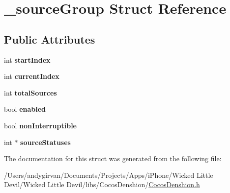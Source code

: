 \hypertarget{struct__source_group}{\section{\-\_\-source\-Group Struct Reference}
\label{struct__source_group}
}
\subsection*{Public Attributes}
\begin{DoxyCompactItemize}
\item 
\hypertarget{struct__source_group_aedf60c32c9f50907a1d7c4ceffebd34a}{int {\bfseries start\-Index}}\label{struct__source_group_aedf60c32c9f50907a1d7c4ceffebd34a}

\item 
\hypertarget{struct__source_group_ac8d629bee48fa95ffe085739c29c8393}{int {\bfseries current\-Index}}\label{struct__source_group_ac8d629bee48fa95ffe085739c29c8393}

\item 
\hypertarget{struct__source_group_af92866596e1c52d38901abb5986f1404}{int {\bfseries total\-Sources}}\label{struct__source_group_af92866596e1c52d38901abb5986f1404}

\item 
\hypertarget{struct__source_group_af41ac2109bf5383ea0c7e2816553055f}{bool {\bfseries enabled}}\label{struct__source_group_af41ac2109bf5383ea0c7e2816553055f}

\item 
\hypertarget{struct__source_group_a31063e653ba9ea9e93ba48131c704b4d}{bool {\bfseries non\-Interruptible}}\label{struct__source_group_a31063e653ba9ea9e93ba48131c704b4d}

\item 
\hypertarget{struct__source_group_a5d8722f751c1d2bfd47232307d6ba18c}{int $\ast$ {\bfseries source\-Statuses}}\label{struct__source_group_a5d8722f751c1d2bfd47232307d6ba18c}

\end{DoxyCompactItemize}


The documentation for this struct was generated from the following file\-:\begin{DoxyCompactItemize}
\item 
/\-Users/andygirvan/\-Documents/\-Projects/\-Apps/i\-Phone/\-Wicked Little Devil/\-Wicked Little Devil/libs/\-Cocos\-Denshion/\hyperlink{_cocos_denshion_8h}{Cocos\-Denshion.\-h}\end{DoxyCompactItemize}
